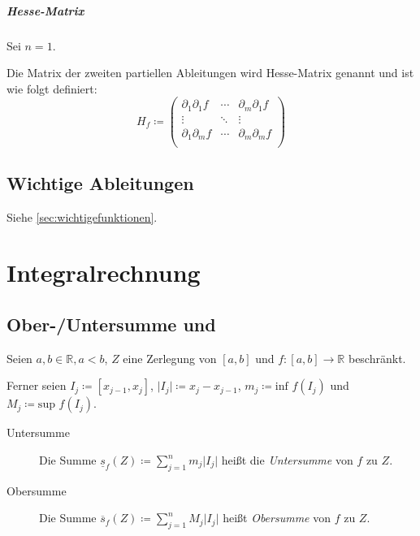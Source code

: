 		\paragraph{Hesse-Matrix}
			Sei $ n = 1 $.

			Die Matrix der zweiten partiellen Ableitungen wird Hesse-Matrix genannt und ist wie folgt definiert:
			\begin{equation*}
				H _ f \coloneqq
				\begin{pmatrix}
					\partial _ 1 \partial _ 1 f & \cdots & \partial _ m \partial _ 1 f \\
					\vdots                      & \ddots & \vdots                      \\
					\partial _ 1 \partial _ m f & \cdots & \partial _ m \partial _ m f \\
				\end{pmatrix}
			\end{equation*}

	\section{Wichtige Ableitungen}
		Siehe \ref{sec:wichtigefunktionen}.

\chapter{Integralrechnung}
	\section{Ober-/Untersumme und}
		Seien $ a, b \in \mathbb{R}, a < b $, $ Z $ eine Zerlegung von $ [a, b] $ und $ f : [a, b] \rightarrow \mathbb{R} $ beschränkt.

		Ferner seien $ I _ j \coloneqq [x _ { j - 1 }, x _ j] $, $ \lvert I _ j \rvert \coloneqq x _ j - x _ { j - 1 } $, $ m _ j \coloneqq \text{inf } f(I _ j) $ und $ M _ j \coloneqq \text{sup } f(I _ j) $.

		\begin{description}
			\item[Untersumme] Die Summe $ \underline{s} _ f (Z) \coloneqq \sum _ { j = 1 } ^ n m _ j \lvert I _ j \rvert $ heißt die \textit{Untersumme} von $ f $ zu $ Z $.
			\item[Obersumme] Die Summe $ \overline{s} _ f (Z) \coloneqq \sum _ { j = 1 } ^ n M _ j \lvert I _ j \rvert $ heißt \textit{Obersumme} von $ f $ zu $ Z $.
		\end{description}

